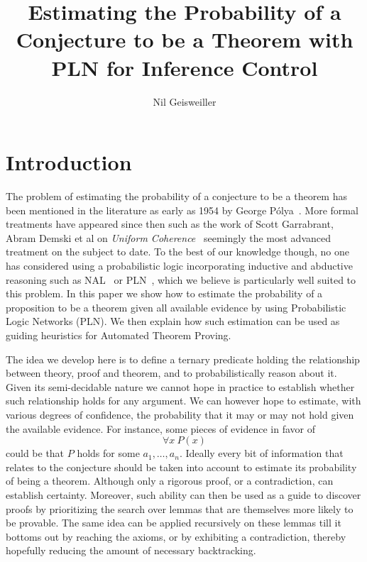 \documentclass{easychair}
\title{Estimating the Probability of a Conjecture to be a Theorem with
  PLN for Inference Control}
\author{Nil Geisweiller}
\institute{
  SingularityNET Foundation,\\
  Zug, Switzerland\\
  \email{nil@singularitynet.io}
}
\begin{document}
\maketitle


\section{Introduction}

The problem of estimating the probability of a conjecture to be a
theorem has been mentioned in the literature as early as 1954 by
George P\'olya~\cite{Polya1954}.  More formal treatments have appeared
since then such as the work of Scott Garrabrant, Abram Demski et al on
\emph{Uniform Coherence}~\cite{Garrabrant2016, Abram2016} seemingly
the most advanced treatment on the subject to date.  To the best of
our knowledge though, no one has considered using a probabilistic
logic incorporating inductive and abductive reasoning such as
NAL~\cite{Wang2013} or PLN~\cite{Goertzel09PLN}, which we believe is
particularly well suited to this problem.  In this paper we show how
to estimate the probability of a proposition to be a theorem given all
available evidence by using Probabilistic Logic Networks (PLN).  We
then explain how such estimation can be used as guiding heuristics for
Automated Theorem Proving.

The idea we develop here is to define a ternary predicate holding the
relationship between theory, proof and theorem, and to
probabilistically reason about it.  Given its semi-decidable nature we
cannot hope in practice to establish whether such relationship holds
for any argument.  We can however hope to estimate, with various
degrees of confidence, the probability that it may or may not hold
given the available evidence.  For instance, some pieces of evidence
in favor of
$$\forall x \ P(x)$$ could be that $P$ holds for some $a_1, \dots,
a_n$.  Ideally every bit of information that relates to the conjecture
should be taken into account to estimate its probability of being a
theorem.  Although only a rigorous proof, or a contradiction, can
establish certainty.  Moreover, such ability can then be used as a
guide to discover proofs by prioritizing the search over lemmas that
are themselves more likely to be provable.  The same idea can be
applied recursively on these lemmas till it bottoms out by reaching
the axioms, or by exhibiting a contradiction, thereby hopefully
reducing the amount of necessary backtracking.
\end{document}

